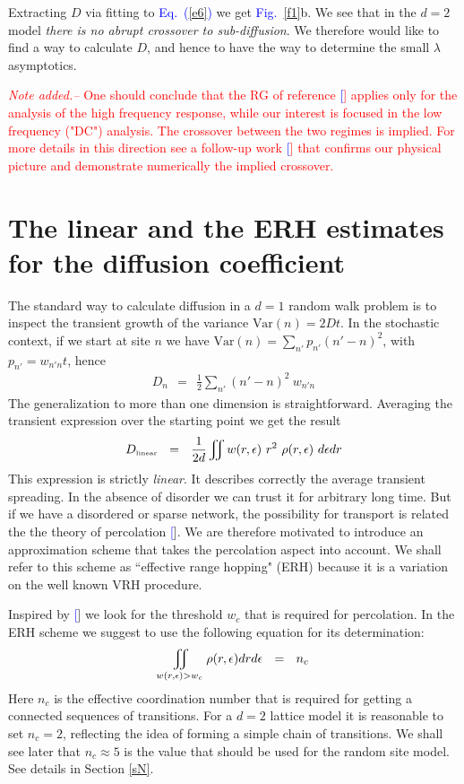 \documentclass[aps,prb,floats,floatfix,twocolumn]{revtex4}
\newcommand{\tbox}[1]{\mbox{\tiny #1}}
\newcommand{\mylabel}[1]{\label{#1}}
\newcommand{\beq}{\begin{eqnarray}}
\newcommand{\eeq}{\end{eqnarray}}
\newcommand{\be}[1]{\begin{eqnarray}\ifthenelse{#1=-1}
{\nonumber}{\ifthenelse{#1=0}{}{\mylabel{e#1}}}}
\newcommand{\Eq}[1]{\textcolor{blue}{Eq.\!\!~(\ref{#1})}}
\newcommand{\Fig}[1]{\textcolor{blue}{Fig.}\!\!~\ref{#1}}
\newcommand{\rmrk}[1]{\textcolor{red}{#1}}
\renewcommand{\cite}[1]{\textcolor{blue}{[\onlinecite{#1}}]} %
\begin{document}
Extracting $D$ via fitting to \Eq{e6} we get \Fig{f1}b. 
We see that in the $d{=}2$ model {\em there is no abrupt crossover 
to sub-diffusion}. We therefore would like to find a way 
to calculate $D$, and hence to have the way to determine 
the small $\lambda$ asymptotics. 


\rmrk{{\em Note added.-- }
%
One should conclude that the RG of reference \cite{amir} 
applies only for the analysis of the high frequency response, 
while our interest is focused in the low frequency ("DC") analysis.
The crossover between the two regimes is implied. 
For more details in this direction see a follow-up work \cite{amirNEW}
that confirms our physical picture and demonstrate numerically 
the implied crossover.
}


\section{The linear and the ERH estimates for the diffusion coefficient}

The standard way to calculate diffusion
in a $d{=}1$ random walk problem is to inspect 
the transient growth of the variance $\mbox{Var}(n)=2Dt$.
In the stochastic context, if we start at site $n$
we have ${\mbox{Var}(n)=\sum_{n'} p_{n'} (n'-n)^2}$, 
with $p_{n'}=w_{n'n}t$, hence
%
\beq
D_n \ \ = \ \ \frac{1}{2} \sum_{n'} (n'-n)^2 \ w_{n'n}
\eeq
%
The generalization to more than one dimension
is straightforward. Averaging the transient expression 
over the starting point we get the result  
%
\be{25}
D_{\tbox{linear}}  \ \ = \ \ \frac{1}{2d}\iint w(r,\epsilon) \ r^2  \ \rho(r,\epsilon) \ d\epsilon dr 
\eeq
%
This expression is strictly {\em linear}.
It describes correctly the average transient spreading. 
In the absence of disorder we can trust it for 
arbitrary long time. But if we have a disordered   
or sparse network, the possibility for transport  
is related the the theory of percolation \cite{AHL,Halp,pollak}.
We are therefore motivated to introduce an approximation 
scheme that takes the percolation aspect into account.
We shall refer to this scheme as ``effective range hopping" (ERH) 
because it is a variation on the well known VRH procedure.


Inspired by \cite{AHL,Halp,pollak} we look for the threshold $w_c$ 
that is required for percolation. In the ERH scheme 
we suggest to use the following equation for its determination: 
%
\be{30}
\iint_{w(r,\epsilon)>w_c} \rho(r,\epsilon)drd\epsilon \ \ = \ \ n_c
\eeq
%
Here $n_c$ is the effective coordination number that is 
required for getting a connected sequences of transitions.
For a $d{=}2$ lattice model it is reasonable to set $n_c=2$, 
reflecting the idea of forming a simple chain of transitions. 
We shall see later that $n_c\approx5$ is the value that should 
be used for the random site model. See details in Section \ref{sN}.
\end{document}
